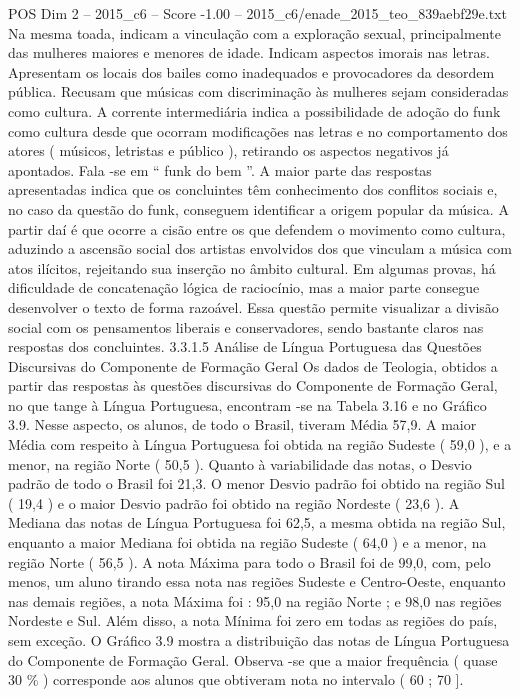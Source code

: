 \begin{textsample}{POS Dim 2 – 2015\_c6 – Score -1.00 – 2015\_c6/enade\_2015\_teo\_839aebf29e.txt}
Na mesma toada, indicam a vinculação com a exploração sexual, principalmente das mulheres maiores e menores de idade.
Indicam aspectos imorais nas letras.
Apresentam os locais dos bailes como inadequados e provocadores da desordem pública.
Recusam que músicas com discriminação às mulheres sejam consideradas como cultura.
A corrente intermediária indica a possibilidade de adoção do funk como cultura desde que ocorram modificações nas letras e no comportamento dos atores ( músicos, letristas e público ), retirando os aspectos negativos já apontados.
Fala -se em “ funk do bem ”.
A maior parte das respostas apresentadas indica que os concluintes têm conhecimento dos conflitos sociais e, no caso da questão do funk, conseguem identificar a origem popular da música.
A partir daí é que ocorre a cisão entre os que defendem o movimento como cultura, aduzindo a ascensão social dos artistas envolvidos dos que vinculam a música com atos ilícitos, rejeitando sua inserção no âmbito cultural.
Em algumas provas, há dificuldade de concatenação lógica de raciocínio, mas a maior parte consegue desenvolver o texto de forma razoável.
Essa questão permite visualizar a divisão social com os pensamentos liberais e conservadores, sendo bastante claros nas respostas dos concluintes. 3.3.1.5 Análise de Língua Portuguesa das Questões Discursivas do Componente de Formação Geral Os dados de Teologia, obtidos a partir das respostas às questões discursivas do Componente de Formação Geral, no que tange à Língua Portuguesa, encontram -se na Tabela 3.16 e no Gráfico 3.9.
Nesse aspecto, os alunos, de todo o Brasil, tiveram Média 57,9.
A maior Média com respeito à Língua Portuguesa foi obtida na região Sudeste ( 59,0 ), e a menor, na região Norte ( 50,5 ).
Quanto à variabilidade das notas, o Desvio padrão de todo o Brasil foi 21,3.
O menor Desvio padrão foi obtido na região Sul ( 19,4 ) e o maior Desvio padrão foi obtido na região Nordeste ( 23,6 ).
A Mediana das notas de Língua Portuguesa foi 62,5, a mesma obtida na região Sul, enquanto a maior Mediana foi obtida na região Sudeste ( 64,0 ) e a menor, na região Norte ( 56,5 ).
A nota Máxima para todo o Brasil foi de 99,0, com, pelo menos, um aluno tirando essa nota nas regiões Sudeste e Centro-Oeste, enquanto nas demais regiões, a nota Máxima foi : 95,0 na região Norte ; e 98,0 nas regiões Nordeste e Sul.
Além disso, a nota Mínima foi zero em todas as regiões do país, sem exceção.
O Gráfico 3.9 mostra a distribuição das notas de Língua Portuguesa do Componente de Formação Geral.
Observa -se que a maior frequência ( quase 30 \% ) corresponde aos alunos que obtiveram nota no intervalo ( 60 ; 70 ].

\end{textsample}
